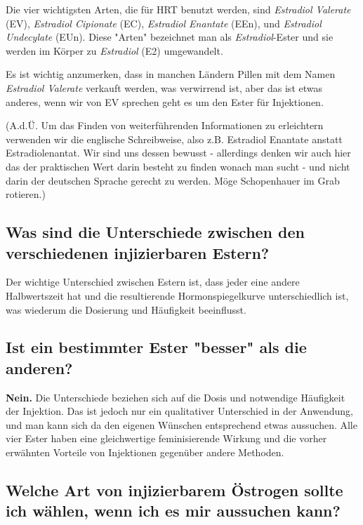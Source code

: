 \documentclass{article}
\begin{document}
Die vier wichtigsten Arten, die für HRT benutzt werden, sind \textit{Estradiol Valerate} (EV), \textit{Estradiol Cipionate} (EC), \textit{Estradiol Enantate} (EEn), und \textit{Estradiol Undecylate} (EUn). Diese "Arten" bezeichnet man als \textit{Estradiol}-Ester und sie werden im Körper zu \textit{Estradiol} (E2)  umgewandelt.

Es ist wichtig anzumerken, dass in manchen Ländern Pillen mit dem Namen \textit{Estradiol Valerate} verkauft werden, was verwirrend ist, aber das ist etwas anderes, wenn wir von EV sprechen geht es um den Ester für Injektionen.

(A.d.Ü. Um das Finden von weiterführenden Informationen zu erleichtern verwenden wir die englische Schreibweise, also z.B. Estradiol Enantate anstatt Estradiolenantat. Wir sind uns dessen bewusst - allerdings denken wir auch hier das der praktischen Wert darin besteht zu finden wonach man sucht - und nicht darin der deutschen Sprache gerecht zu werden. Möge Schopenhauer im Grab rotieren.)

\subsection{Was sind die Unterschiede zwischen den verschiedenen injizierbaren Estern?}

Der wichtige Unterschied zwischen Estern ist, dass jeder eine andere Halbwertszeit hat und die resultierende Hormonspiegelkurve unterschiedlich ist, was wiederum die Dosierung und Häufigkeit beeinflusst.

\subsection{Ist ein bestimmter Ester "besser" als die anderen?}

\textbf{Nein.} Die Unterschiede beziehen sich auf die Dosis und notwendige Häufigkeit der Injektion. Das ist jedoch nur ein qualitativer Unterschied in der Anwendung, und man kann sich da den eigenen Wünschen entsprechend etwas aussuchen. Alle vier Ester haben eine gleichwertige feminisierende Wirkung und die vorher erwähnten Vorteile von Injektionen gegenüber andere Methoden.

\subsection{Welche Art von injizierbarem Östrogen sollte ich wählen, wenn ich es mir aussuchen kann?}
\end{document}
